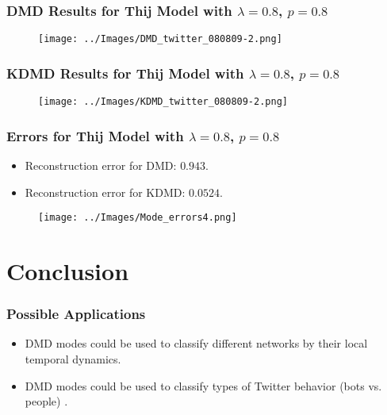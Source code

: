 \documentclass{beamer}
\begin{document}
\begin{frame}
    \frametitle{DMD Results for Thij Model with $\lambda=0.8$, $p=0.8$}
    \begin{figure}
        \texttt{[image: ../Images/DMD\_twitter\_080809-2.png]}
        \centering
    \end{figure}
\end{frame}

\begin{frame}
    \frametitle{KDMD Results for Thij Model with $\lambda=0.8$, $p=0.8$}
    \begin{figure}
        \texttt{[image: ../Images/KDMD\_twitter\_080809-2.png]}
        \centering
    \end{figure}
\end{frame}

\begin{frame}
    \frametitle{Errors for Thij Model with $\lambda=0.8$, $p=0.8$}
    \begin{itemize}
        \item  Reconstruction error for DMD: $0.943$. 
        \item  Reconstruction error for KDMD: $0.0524$.
    \end{itemize}
   
    \begin{figure}
        \texttt{[image: ../Images/Mode\_errors4.png]}
        \centering
    \end{figure}
\end{frame}

\section{Conclusion}

\begin{frame}
    \frametitle{Possible Applications}
    \begin{itemize}
        \item DMD modes could be used to classify different networks by their local temporal dynamics.
        \item DMD modes could be used to classify types of Twitter behavior (bots vs. people) \cite{ferrara2020covid} \cite{bovet2019influence} \cite{Grant}.
    \end{itemize}
    \end{frame}
\end{document}

